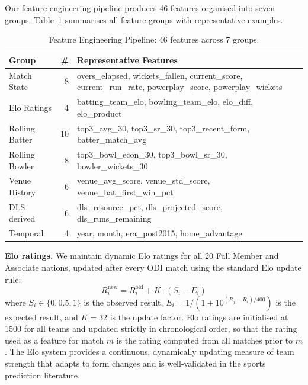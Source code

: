 \documentclass[10pt,a4paper,twocolumn]{article}
\begin{document}
Our feature engineering pipeline produces 46 features organised into seven groups. Table~\ref{tab:features} summarises all feature groups with representative examples.

\begin{table}[h]
\centering
\caption{Feature Engineering Pipeline: 46 features across 7 groups.}
\label{tab:features}
\footnotesize
\begin{tabular}{@{}p{2.2cm}rp{3.6cm}@{}}
\toprule
\textbf{Group} & \textbf{\#} & \textbf{Representative Features} \\
\midrule
Match State & 8 & overs\_elapsed, wickets\_fallen, current\_score, current\_run\_rate, powerplay\_score, powerplay\_wickets \\
\addlinespace
Elo Ratings & 4 & batting\_team\_elo, bowling\_team\_elo, elo\_diff, elo\_product \\
\addlinespace
Rolling Batter & 10 & top3\_avg\_30, top3\_sr\_30, top3\_recent\_form, batter\_match\_avg \\
\addlinespace
Rolling Bowler & 8 & top3\_bowl\_econ\_30, top3\_bowl\_sr\_30, bowler\_wickets\_30 \\
\addlinespace
Venue History & 6 & venue\_avg\_score, venue\_std\_score, venue\_bat\_first\_win\_pct \\
\addlinespace
DLS-derived & 6 & dls\_resource\_pct, dls\_projected\_score, dls\_runs\_remaining \\
\addlinespace
Temporal & 4 & year, month, era\_post2015, home\_advantage \\
\bottomrule
\end{tabular}
\end{table}

\textbf{Elo ratings.} We maintain dynamic Elo ratings for all 20 Full Member and Associate nations, updated after every ODI match using the standard Elo update rule:
\begin{equation}
R_i^{\text{new}} = R_i^{\text{old}} + K \cdot (S_i - E_i)
\label{eq:elo}
\end{equation}
where $S_i \in \{0, 0.5, 1\}$ is the observed result, $E_i = 1/(1 + 10^{(R_j - R_i)/400})$ is the expected result, and $K = 32$ is the update factor. Elo ratings are initialised at 1500 for all teams and updated strictly in chronological order, so that the rating used as a feature for match $m$ is the rating computed from all matches prior to $m$. The Elo system provides a continuous, dynamically updating measure of team strength that adapts to form changes and is well-validated in the sports prediction literature.
\end{document}
